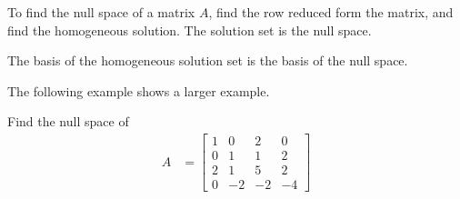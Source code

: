 \begin{Boxed*}
To find the null space of a matrix $A$, find the row reduced form the matrix, and find the homogeneous solution.  The solution set is the null space.  

\medskip

\noindent{}The basis of the homogeneous solution set is the basis of the null space.  
\end{Boxed*}


The following example shows a larger example.  

\begin{example} \label{ex:nullity2}
Find the null space of 
%
\begin{align*}
A & = \begin{bmatrix}
1 & 0 & 2 & 0 \\
0 & 1 & 1 & 2 \\
2 & 1 & 5 & 2 \\
0 & -2 & -2 & -4 
\end{bmatrix}
\end{align*}

\solution


\end{example}
